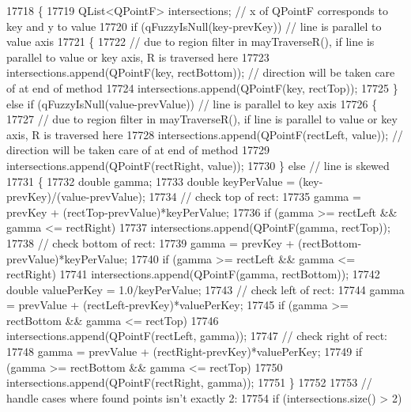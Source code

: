 \begin{DoxyCode}
17718 \{
17719   QList<QPointF> intersections; \textcolor{comment}{// x of QPointF corresponds to key and y to value}
17720   \textcolor{keywordflow}{if} (qFuzzyIsNull(key-prevKey)) \textcolor{comment}{// line is parallel to value axis}
17721   \{
17722     \textcolor{comment}{// due to region filter in mayTraverseR(), if line is parallel to value or key axis, R is traversed
       here}
17723     intersections.append(QPointF(key, rectBottom)); \textcolor{comment}{// direction will be taken care of at end of method}
17724     intersections.append(QPointF(key, rectTop));
17725   \} \textcolor{keywordflow}{else} \textcolor{keywordflow}{if} (qFuzzyIsNull(value-prevValue)) \textcolor{comment}{// line is parallel to key axis}
17726   \{
17727     \textcolor{comment}{// due to region filter in mayTraverseR(), if line is parallel to value or key axis, R is traversed
       here}
17728     intersections.append(QPointF(rectLeft, value)); \textcolor{comment}{// direction will be taken care of at end of method}
17729     intersections.append(QPointF(rectRight, value));
17730   \} \textcolor{keywordflow}{else} \textcolor{comment}{// line is skewed}
17731   \{
17732     \textcolor{keywordtype}{double} gamma;
17733     \textcolor{keywordtype}{double} keyPerValue = (key-prevKey)/(value-prevValue);
17734     \textcolor{comment}{// check top of rect:}
17735     gamma = prevKey + (rectTop-prevValue)*keyPerValue;
17736     \textcolor{keywordflow}{if} (gamma >= rectLeft && gamma <= rectRight)
17737       intersections.append(QPointF(gamma, rectTop));
17738     \textcolor{comment}{// check bottom of rect:}
17739     gamma = prevKey + (rectBottom-prevValue)*keyPerValue;
17740     \textcolor{keywordflow}{if} (gamma >= rectLeft && gamma <= rectRight)
17741       intersections.append(QPointF(gamma, rectBottom));
17742     \textcolor{keywordtype}{double} valuePerKey = 1.0/keyPerValue;
17743     \textcolor{comment}{// check left of rect:}
17744     gamma = prevValue + (rectLeft-prevKey)*valuePerKey;
17745     \textcolor{keywordflow}{if} (gamma >= rectBottom && gamma <= rectTop)
17746       intersections.append(QPointF(rectLeft, gamma));
17747     \textcolor{comment}{// check right of rect:}
17748     gamma = prevValue + (rectRight-prevKey)*valuePerKey;
17749     \textcolor{keywordflow}{if} (gamma >= rectBottom && gamma <= rectTop)
17750       intersections.append(QPointF(rectRight, gamma));
17751   \}
17752   
17753   \textcolor{comment}{// handle cases where found points isn't exactly 2:}
17754   \textcolor{keywordflow}{if} (intersections.size() > 2)

\end{DoxyCode}
